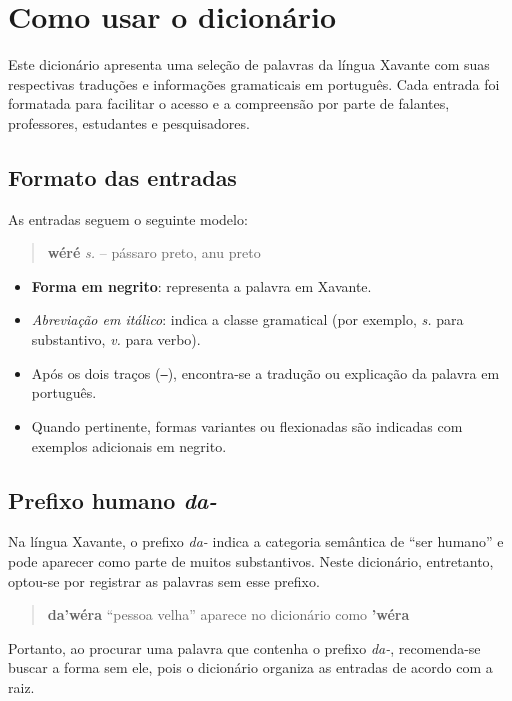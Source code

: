 \chapter*{Como usar o dicionário}

Este dicionário apresenta uma seleção de palavras da língua Xavante com suas respectivas traduções e informações gramaticais em português. Cada entrada foi formatada para facilitar o acesso e a compreensão por parte de falantes, professores, estudantes e pesquisadores.

\section*{Formato das entradas}

As entradas seguem o seguinte modelo:

\begin{quote}
\textbf{wéré} \textit{s.} -- pássaro preto, anu preto
\end{quote}

\begin{itemize}
  \item \textbf{Forma em negrito}: representa a palavra em Xavante.
  \item \textit{Abreviação em itálico}: indica a classe gramatical (por exemplo, \textit{s.} para substantivo, \textit{v.} para verbo).
  \item Após os dois traços (\texttt{--}), encontra-se a tradução ou explicação da palavra em português.
  \item Quando pertinente, formas variantes ou flexionadas são indicadas com exemplos adicionais em negrito.
\end{itemize}

\section*{Prefixo humano \textit{da-}}

Na língua Xavante, o prefixo \textit{da-} indica a categoria semântica de “ser humano” e pode aparecer como parte de muitos substantivos. Neste dicionário, entretanto, optou-se por registrar as palavras sem esse prefixo.

\begin{quote}
\textbf{da’wéra} “pessoa velha” aparece no dicionário como \textbf{’wéra}
\end{quote}

Portanto, ao procurar uma palavra que contenha o prefixo \textit{da-}, recomenda-se buscar a forma sem ele, pois o dicionário organiza as entradas de acordo com a raiz.

